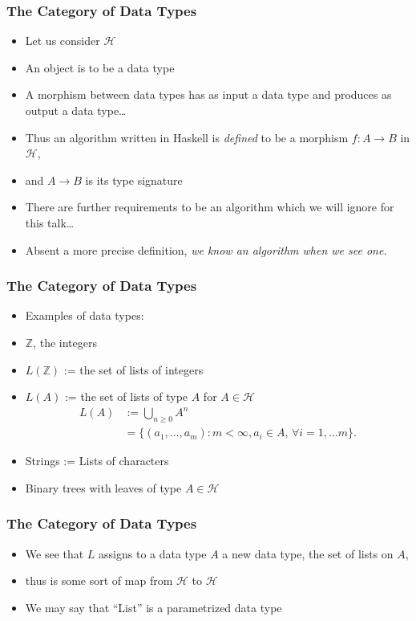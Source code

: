 \documentclass[xcolor=pdftex,dvipsnames,table]{beamer}
\newcommand{\typ}{\ensuremath{\mathcal{H}}}
\newcommand{\Z}{\ensuremath{\mathbb{Z}}}
\newcommand{\hili}[1]{\emph{\textcolor{title}{#1}}}
\begin{document}
\begin{frame}
    \frametitle{The Category of Data Types}
    \begin{itemize}
        \item Let us consider \typ \pause
        \item An object is to be a data type\pause
        \item A morphism between data types has as input a data type
            and produces as output a data type\ldots\pause
        \item Thus an algorithm written in Haskell is \hili{defined}
            to be a morphism $f: A \rightarrow B$ in \typ, \pause
        \item and $A \rightarrow B$ is its type signature \pause
        \item There are further requirements to be an algorithm which
            we will ignore for this talk\ldots\pause
        \item Absent a more precise definition, \textit{we know an
            algorithm when we see one.}
    \end{itemize}
\end{frame}

\begin{frame}
    \frametitle{The Category of Data Types}
    \begin{itemize}
        \item Examples of data types:\pause
        \item $\Z$, the integers\pause
        \item $L(\Z)$ := the set of lists of integers\pause
        \item $L(A) $ := the set of lists of type $A$ for $A\in
            \typ$\pause
\begin{align*}
            L(A) & := \bigcup_{n \ge 0} A^n \\
            & = \{(a_1,\dots,a_m) : m < \infty, a_i \in A,\, \forall
            i=1,\dots m\}.
\end{align*}
        \item Strings := Lists of characters\pause
        \item Binary trees with leaves of type $A\in \typ$
    \end{itemize}
\end{frame}

\begin{frame}
    \frametitle{The Category of Data Types}
    \begin{itemize}
        \item We see that $L$ assigns to a data type $A$ a new data
            type, the set of lists on $A$,\pause
        \item thus is some sort of map from \typ{} to \typ{}\pause
        \item We may say that ``List'' is a parametrized data type
    \end{itemize}
\end{frame}
\end{document}
